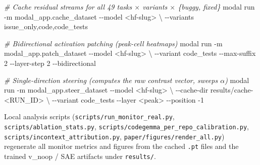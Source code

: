 \documentclass[
  11pt,
  a4paper]{article}
\newenvironment{Shaded}{}{}
\newcommand{\AttributeTok}[1]{\textcolor[rgb]{0.49,0.56,0.16}{#1}}
\newcommand{\CommentTok}[1]{\textcolor[rgb]{0.38,0.63,0.69}{\textit{#1}}}
\newcommand{\DataTypeTok}[1]{\textcolor[rgb]{0.56,0.13,0.00}{#1}}
\newcommand{\ExtensionTok}[1]{#1}
\newcommand{\NormalTok}[1]{#1}
\newcommand{\OperatorTok}[1]{\textcolor[rgb]{0.40,0.40,0.40}{#1}}
\begin{document}
\begin{Shaded}
\begin{Highlighting}[]
\CommentTok{\# Cache residual streams for all 49 tasks \ensuremath{\times} variants \ensuremath{\times} \{buggy, fixed\}}
\ExtensionTok{modal}\NormalTok{ run }\AttributeTok{{-}m}\NormalTok{ modal\_app.cache\_dataset }\AttributeTok{{-}{-}model} \OperatorTok{\textless{}}\NormalTok{hf{-}slug}\OperatorTok{\textgreater{}} \DataTypeTok{\textbackslash{}}
 \AttributeTok{{-}{-}variants}\NormalTok{ issue\_only,code,code\_tests}

\CommentTok{\# Bidirectional activation patching (peak{-}cell heatmaps)}
\ExtensionTok{modal}\NormalTok{ run }\AttributeTok{{-}m}\NormalTok{ modal\_app.patch\_dataset }\AttributeTok{{-}{-}model} \OperatorTok{\textless{}}\NormalTok{hf{-}slug}\OperatorTok{\textgreater{}} \DataTypeTok{\textbackslash{}}
 \AttributeTok{{-}{-}variant}\NormalTok{ code\_tests }\AttributeTok{{-}{-}max{-}suffix}\NormalTok{ 2 }\AttributeTok{{-}{-}layer{-}step}\NormalTok{ 2 }\AttributeTok{{-}{-}bidirectional}

\CommentTok{\# Single{-}direction steering (computes the raw contrast vector, sweeps \ensuremath{\alpha})}
\ExtensionTok{modal}\NormalTok{ run }\AttributeTok{{-}m}\NormalTok{ modal\_app.steer\_dataset }\AttributeTok{{-}{-}model} \OperatorTok{\textless{}}\NormalTok{hf{-}slug}\OperatorTok{\textgreater{}} \DataTypeTok{\textbackslash{}}
 \AttributeTok{{-}{-}cache{-}dir}\NormalTok{ results/cache{-}}\OperatorTok{\textless{}}\NormalTok{RUN\_ID}\OperatorTok{\textgreater{}} \DataTypeTok{\textbackslash{}}
 \AttributeTok{{-}{-}variant}\NormalTok{ code\_tests }\AttributeTok{{-}{-}layer} \OperatorTok{\textless{}}\NormalTok{peak}\OperatorTok{\textgreater{}}\NormalTok{ {-}{-}position }\AttributeTok{{-}1}
\end{Highlighting}
\end{Shaded}

Local analysis scripts (\texttt{scripts/run\_monitor\_real.py},
\texttt{scripts/ablation\_stats.py},
\texttt{scripts/codegemma\_per\_repo\_calibration.py},
\texttt{scripts/incontext\_attribution.py},
\texttt{paper/figures/render\_all.py}) regenerate all monitor metrics
and figures from the cached \texttt{.pt} files and the trained v\_noop /
SAE artifacts under \texttt{results/}.
\end{document}
